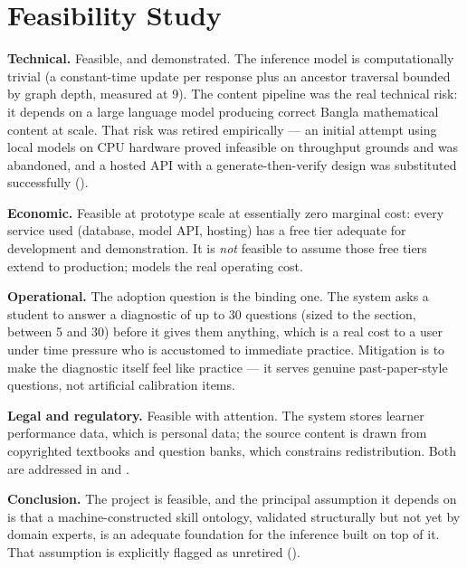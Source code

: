 \section{Feasibility Study}
\label{sec:feasibility}

\textbf{Technical.} Feasible, and demonstrated. The inference model is
computationally trivial (a constant-time update per response plus an ancestor
traversal bounded by graph depth, measured at 9). The content pipeline was the
real technical risk: it depends on a large language model producing correct
Bangla mathematical content at scale. That risk was retired empirically --- an
initial attempt using local models on CPU hardware proved infeasible on
throughput grounds and was abandoned, and a hosted API with a
generate-then-verify design was substituted successfully
().

\textbf{Economic.} Feasible at prototype scale at essentially zero marginal
cost: every service used (database, model API, hosting) has a free tier adequate
for development and demonstration. It is \emph{not} feasible to assume those
free tiers extend to production;  models the real operating
cost.

\textbf{Operational.} The adoption question is the binding one. The system asks
a student to answer a diagnostic of up to 30 questions (sized to the section,
between 5 and 30) before it gives them anything,
which is a real cost to a user under time pressure who is accustomed to
immediate practice. Mitigation is to make the diagnostic itself feel like
practice --- it serves genuine past-paper-style questions, not artificial
calibration items.

\textbf{Legal and regulatory.} Feasible with attention. The system stores
learner performance data, which is personal data; the source content is drawn
from copyrighted textbooks and question banks, which constrains redistribution.
Both are addressed in  and .

\textbf{Conclusion.} The project is feasible, and the principal assumption it
depends on is that a machine-constructed skill ontology, validated structurally
but not yet by domain experts, is an adequate foundation for the inference built
on top of it. That assumption is explicitly flagged as unretired
().
